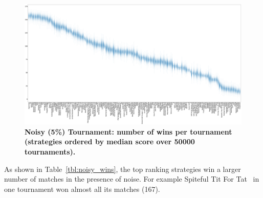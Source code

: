 \documentclass[10pt,letterpaper]{article}
\begin{document}
\begin{landscape}
    \begin{figure}[!hbtp]
        \centering
        \includegraphics[width=\paperwidth]{noisy_wins_boxplots.eps}
        \caption{\bf Noisy (5\%) Tournament: number of wins per tournament
            (strategies ordered by median score over 50000 tournaments).}
        \label{fig:noisy_winplot}
    \end{figure}
\end{landscape}

As shown in Table~\ref{tbl:noisy_wins}, the top ranking strategies win a larger
number of matches in the presence of noise. For example Spiteful Tit For Tat~\cite{Prison1998}
in one tournament won almost all its matches (167).
\end{document}
